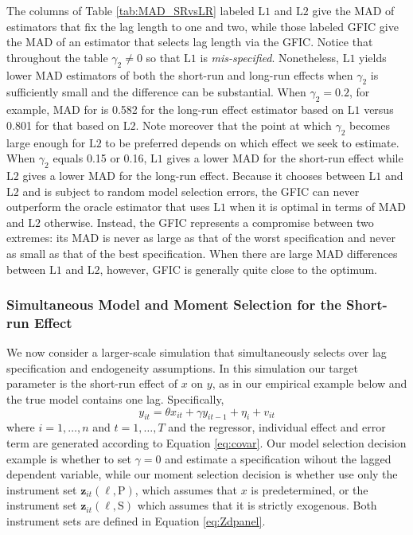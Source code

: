 The columns of Table \ref{tab:MAD_SRvsLR} labeled $\mbox{L1}$ and $\mbox{L2}$ give the MAD of estimators that fix the lag length to one and two, while those labeled GFIC give the MAD of an estimator that selects lag length via the GFIC.
Notice that throughout the table $\gamma_2 \neq 0$ so that $\mbox{L1}$ is \emph{mis-specified}.
Nonetheless, $\mbox{L1}$ yields lower MAD estimators of both the short-run and long-run effects when $\gamma_2$ is sufficiently small and the difference can be substantial.
When $\gamma_2 = 0.2$, for example, MAD for is 0.582 for the long-run effect estimator based on $\mbox{L1}$ versus 0.801 for that based on $\mbox{L2}$.
Note moreover that the point at which $\gamma_2$ becomes large enough for $\mbox{L2}$ to be preferred depends on which effect we seek to estimate.
When $\gamma_2$ equals 0.15 or 0.16, $\mbox{L1}$ gives a lower MAD for the short-run effect while $\mbox{L2}$ gives a lower MAD for the long-run effect.
Because it chooses between $\mbox{L1}$ and $\mbox{L2}$ and is subject to random model selection errors, the GFIC can never outperform the oracle estimator that uses $\mbox{L1}$ when it is optimal in terms of MAD and $\mbox{L2}$ otherwise.
Instead, the GFIC represents a compromise between two extremes: its MAD is never as large as that of the worst specification and never as small as that of the best specification.
When there are large MAD differences between $\mbox{L1}$ and $\mbox{L2}$, however, GFIC is generally quite close to the optimum.


\subsubsection{Simultaneous Model and Moment Selection for the Short-run Effect}
\label{sec:Dpanel_sim_SR}
We now consider a larger-scale simulation that simultaneously selects over lag specification and endogeneity assumptions. 
In this simulation our target parameter is the short-run effect of $x$ on $y$, as in our empirical example below and the true model contains one lag.
Specifically, 
\[
  y_{it} = \theta x_{it} + \gamma y_{it-1}  + \eta_i + v_{it}
\]
where $i = 1, \dots, n$ and $t = 1, \dots, T$ and the regressor, individual effect and error term are generated according to Equation \ref{eq:covar}.
Our model selection decision example is whether to set $\gamma = 0$ and estimate a specification wihout the lagged dependent variable, while our moment selection decision is whether use only the instrument set $\mathbf{z}_{it}(\ell,\text{P})$, 
which assumes that $x$ is predetermined, or the instrument set $\mathbf{z}_{it}(\ell,\text{S})$ which assumes that it is strictly exogenous.
Both instrument sets are defined in Equation \ref{eq:Zdpanel}.

